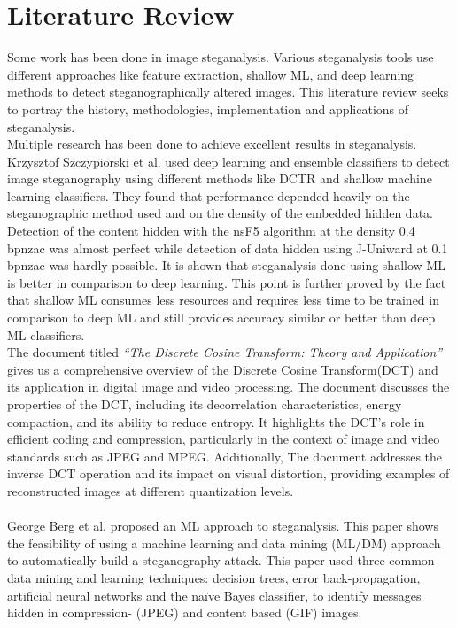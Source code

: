 \chapter{Literature Review}  \sloppy
Some work has been done in image steganalysis. Various steganalysis tools use different approaches like feature extraction, shallow ML, and deep learning methods to detect steganographically altered images. This literature review seeks to portray the history, methodologies, implementation and applications of steganalysis.\\
Multiple research has been done to achieve excellent results in steganalysis. Krzysztof Szczypiorski et al.\cite{1} used deep learning and ensemble classifiers to detect image steganography using different methods like DCTR and shallow machine learning classifiers. They found that performance depended heavily on the steganographic method used and on the density of the embedded hidden data. Detection of the content hidden with the nsF5 algorithm at the density 0.4 bpnzac was almost perfect while detection of data hidden using J-Uniward at 0.1 bpnzac was hardly possible. It is shown that steganalysis done using shallow ML is better in comparison to deep learning. This point is further proved by the fact that shallow ML consumes less resources and requires less time to be trained in comparison to deep ML and still provides accuracy similar or better than deep ML classifiers. \\
The document titled \textit{``The Discrete Cosine Transform: Theory and Application''}\cite{4} gives us a comprehensive overview of the Discrete Cosine Transform(DCT) and its application in digital image and video processing. The document discusses the properties of the DCT, including its decorrelation characteristics, energy compaction, and its ability to reduce entropy. It highlights the DCT's role in efficient coding and compression, particularly in the context of image and video standards such as JPEG and MPEG. Additionally, The document addresses the inverse DCT operation and its impact on visual distortion, providing examples of reconstructed images at different quantization levels.\\
\\George Berg et al.\cite{2} proposed an ML approach to steganalysis. This paper shows the feasibility of using a machine learning and data mining (ML/DM) approach to automatically build a steganography attack. This paper used three common data mining and learning techniques: decision trees, error back-propagation, artificial neural networks and the naïve Bayes classifier, to identify messages hidden in compression- (JPEG) and content based (GIF) images.\\
